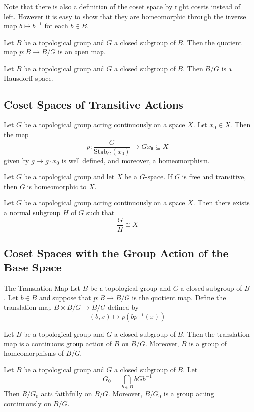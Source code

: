\documentclass[a4paper]{article}
\begin{document}
Note that there is also a definition of the coset space by right cosets instead of left. However it is easy to show that they are homeomorphic through the inverse map $b\mapsto b^{-1}$ for each $b\in B$. 

\begin{prp}{}{} Let $B$ be a topological group and $G$ a closed subgroup of $B$. Then the quotient map $p:B\to B/G$ is an open map. 
\end{prp}

\begin{prp}{}{} Let $B$ be a topological group and $G$ a closed subgroup of $B$. Then $B/G$ is a Hausdorff space. 
\end{prp}

\subsection{Coset Spaces of Transitive Actions}
\begin{thm}{}{} Let $G$ be a topological group acting continuously on a space $X$.  Let $x_0\in X$. Then the map $$p:\frac{G}{\text{Stab}_G(x_0)}\to Gx_0\subseteq X$$ given by $g\mapsto g\cdot x_0$ is well defined, and moreover, a homeomorphism. 
\end{thm}

\begin{crl}{}{} Let $G$ be a topological group and let $X$ be a $G$-space. If $G$ is free and transitive, then $G$ is homeomorphic to $X$. 
\end{crl}

\begin{crl}{}{} Let $G$ be a topological group acting continuously on a space $X$.  Then there exists a normal subgroup $H$ of $G$ such that $$\frac{G}{H}\cong X$$
\end{crl}

\subsection{Coset Spaces with the Group Action of the Base Space}
\begin{defn}{The Translation Map}{} Let $B$ be a topological group and $G$ a closed subgroup of $B$. Let $b\in B$ and suppose that $p:B\to B/G$ is the quotient map. Define the translation map $B\times B/G\to B/G$ defined by $$(b,x)\mapsto p(bp^{-1}(x))$$
\end{defn}

\begin{prp}{}{} Let $B$ be a topological group and $G$ a closed subgroup of $B$. Then the translation map is a continuous group action of $B$ on $B/G$. Moreover, $B$ is a group of homeomorphisms of $B/G$. 
\end{prp}

\begin{prp}{}{} Let $B$ be a topological group and $G$ a closed subgroup of $B$. Let $$G_0=\bigcap_{b\in B}bGb^{-1}$$ Then $B/G_0$ acts faithfully on $B/G$. Moreover, $B/G_0$ is a group acting continuously on $B/G$. 
\end{prp}
\end{document}

